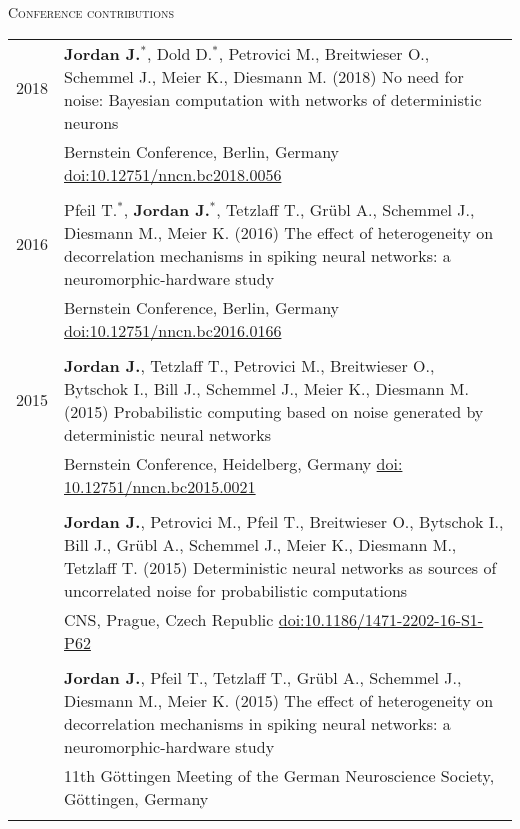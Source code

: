 \textsc{Conference contributions}
\begin{longtable}{>{\hfill}p{1.6cm} p{}}
  2018 & \textbf{Jordan J.}$^*$, Dold D.$^*$, Petrovici M., Breitwieser O., Schemmel J., Meier K., Diesmann M. (2018) No need for noise: Bayesian computation with networks of deterministic neurons \\
  & \footnotesize Bernstein Conference, Berlin, Germany \href{http://doi.org/10.12751/nncn.bc2018.0056}{doi:10.12751/nncn.bc2018.0056}\\
  \multicolumn{2}{c}{} \\
  2016 & Pfeil T.$^*$, \textbf{Jordan J.}$^*$, Tetzlaff T., Gr\"ubl A., Schemmel J., Diesmann M., Meier K. (2016) The effect of heterogeneity on decorrelation mechanisms in spiking neural networks: a neuromorphic-hardware study \\
  & \footnotesize Bernstein Conference, Berlin, Germany \href{http://dx.doi.org/10.12751/nncn.bc2016.0166}{doi:10.12751/nncn.bc2016.0166}\\
  \multicolumn{2}{c}{} \\
  2015 & \textbf{Jordan J.}, Tetzlaff T., Petrovici M., Breitwieser O., Bytschok I., Bill J., Schemmel J., Meier K., Diesmann M. (2015) Probabilistic computing based on noise generated by deterministic neural networks\\
  & \footnotesize Bernstein Conference, Heidelberg, Germany \href{http://dx.doi.org/10.12751/nncn.bc2015.0021}{doi: 10.12751/nncn.bc2015.0021}\\
 \multicolumn{2}{c}{} \\
  & \textbf{Jordan J.}, Petrovici M., Pfeil T., Breitwieser O., Bytschok I., Bill J., Gr\"ubl A., Schemmel J., Meier K., Diesmann M., Tetzlaff T. (2015) Deterministic neural networks as sources of uncorrelated noise for probabilistic computations\\
  & \footnotesize CNS, Prague, Czech Republic \href{http://dx.doi.org/10.1186/1471-2202-16-S1-P62}{doi:10.1186/1471-2202-16-S1-P62} \\
 \multicolumn{2}{c}{} \\
  & \textbf{Jordan J.}, Pfeil T., Tetzlaff T., Gr\"ubl A., Schemmel J., Diesmann M., Meier K. (2015) The effect of heterogeneity on decorrelation mechanisms in spiking neural networks: a neuromorphic-hardware study \\
  & \footnotesize 11th G\"ottingen Meeting of the German Neuroscience Society, G\"ottingen, Germany \\
  \multicolumn{2}{c}{} \\

\end{longtable}

